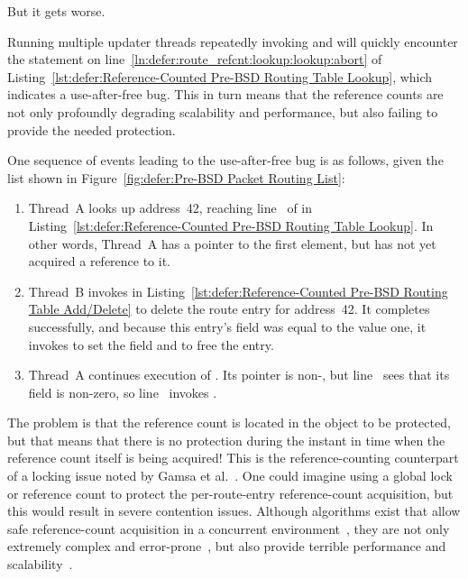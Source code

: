 But it gets worse.

Running multiple updater threads repeatedly invoking
 and  will quickly encounter the
 statement on
line~\ref{ln:defer:route_refcnt:lookup:lookup:abort} of
Listing~\ref{lst:defer:Reference-Counted Pre-BSD Routing Table Lookup},
which indicates a use-after-free bug.
This in turn means that the reference counts are not only profoundly
degrading scalability and performance, but also failing to provide
the needed protection.

One sequence of events leading to the use-after-free bug is as follows,
given the list shown in
Figure~\ref{fig:defer:Pre-BSD Packet Routing List}:

\begin{fcvref}
\begin{enumerate}
\item	Thread~A looks up address~42, reaching
	line~ of
	 in
	Listing~\ref{lst:defer:Reference-Counted Pre-BSD Routing Table Lookup}.
	In other words, Thread~A has a pointer to the first element,
	but has not yet acquired a reference to it.
\item	Thread~B invokes  in
	Listing~\ref{lst:defer:Reference-Counted Pre-BSD Routing Table Add/Delete}
	to delete the route entry for address~42.
	It completes successfully, and because this entry's 
	field was equal to the value one, it invokes
	 to set the  field and to free the entry.
\item	Thread~A continues execution of .
	Its  pointer is non-, but
	line~ sees that
	its  field is non-zero,
        so line~ invokes
	.
\end{enumerate}
\end{fcvref}

The problem is that the reference count is located in the object
to be protected, but that means that there is no protection during
the instant in time when the reference count itself is being acquired!
This is the reference-counting counterpart of a locking issue noted
by Gamsa et al.~\cite{Gamsa99}.
One could imagine using a global lock or reference count to protect
the per-route-entry reference-count acquisition, but this would
result in severe contention issues.
Although algorithms exist that allow safe reference-count acquisition
in a concurrent environment~\cite{Valois95a}, they are not only extremely
complex and error-prone~\cite{MagedMichael95a}, but also provide
terrible performance and scalability~\cite{ThomasEHart2007a}.

